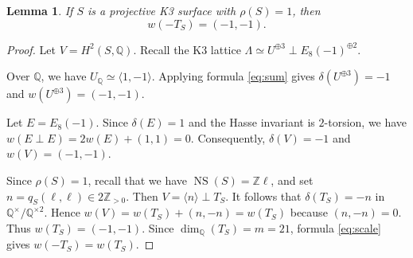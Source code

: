 \documentclass[10pt,a4paper]{amsart}
\newtheorem{lemma}{Lemma}
\newcommand{\NS}{\operatorname{NS}}
\newcommand{\Q}{\mathbb{Q}}
\newcommand{\Z}{\mathbb{Z}}
\begin{document}
\begin{lemma}\label{lem:k3-hasse}
If $S$ is a projective K3 surface with $\rho(S)=1$, then
\begin{equation*}
w(-T_S)=(-1,-1).
\end{equation*}
\end{lemma}

\begin{proof}
Let $V=H^2(S,\Q)$. Recall the K3 lattice $\Lambda\simeq U^{\oplus3}\perp E_8(-1)^{\oplus2}$. 

Over $\Q$, we have $U_{\Q}\simeq\langle1,-1\rangle$. Applying formula \eqref{eq:sum} gives $\delta(U^{\oplus3})=-1$ and $w(U^{\oplus3})=(-1,-1)$. 

Let $E=E_8(-1)$. Since $\delta(E)=1$ and the Hasse invariant is
$2$-torsion, we have $w(E\perp E)=2w(E)+(1,1)=0$. Consequently, $\delta(V)=-1$ and $w(V)=(-1,-1)$.

Since $\rho(S)=1$, recall that we have $\NS(S)=\Z\ell$, and set $n=q_S(\ell,\ell)\in2\Z_{>0}$. Then $V=\langle n\rangle\perp T_S$. 
It follows that $\delta(T_S)=-n$ in $\Q^\times/\Q^{\times2}$. Hence $w(V)=w(T_S)+(n,-n)=w(T_S)$ because $(n,-n)=0$. Thus $w(T_S)=(-1,-1)$. Since $\operatorname{dim}_\Q(T_S)=m=21$, formula \eqref{eq:scale} gives $w(-T_S)=w(T_S)$. 
\end{proof}
\end{document}
